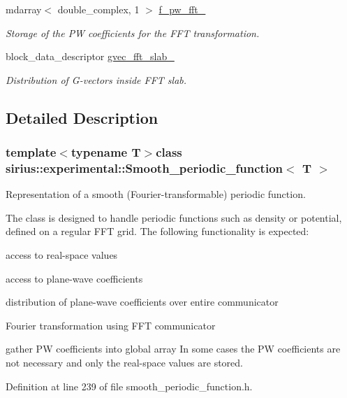 \begin{DoxyCompactItemize}
mdarray$<$ double\+\_\+complex, 1 $>$ \hyperlink{classsirius_1_1experimental_1_1_smooth__periodic__function_a711aaa88df6147e6642bf2b669e0a5ce}{f\+\_\+pw\+\_\+fft\+\_\+}
\begin{DoxyCompactList}\small\item\em Storage of the P\+W coefficients for the F\+F\+T transformation. \end{DoxyCompactList}\item 
block\+\_\+data\+\_\+descriptor \hyperlink{classsirius_1_1experimental_1_1_smooth__periodic__function_ac7252a0a850a93fe826ec2bc52dbe769}{gvec\+\_\+fft\+\_\+slab\+\_\+}
\begin{DoxyCompactList}\small\item\em Distribution of G-\/vectors inside F\+F\+T slab. \end{DoxyCompactList}\end{DoxyCompactItemize}


\subsection{Detailed Description}
\subsubsection*{template$<$typename T$>$class sirius\+::experimental\+::\+Smooth\+\_\+periodic\+\_\+function$<$ T $>$}

Representation of a smooth (Fourier-\/transformable) periodic function. 

The class is designed to handle periodic functions such as density or potential, defined on a regular F\+F\+T grid. The following functionality is expected\+:
\begin{DoxyItemize}
\item access to real-\/space values
\item access to plane-\/wave coefficients
\item distribution of plane-\/wave coefficients over entire communicator
\item Fourier transformation using F\+F\+T communicator
\item gather P\+W coefficients into global array In some cases the P\+W coefficients are not necessary and only the real-\/space values are stored. 
\end{DoxyItemize}

Definition at line 239 of file smooth\+\_\+periodic\+\_\+function.\+h.



